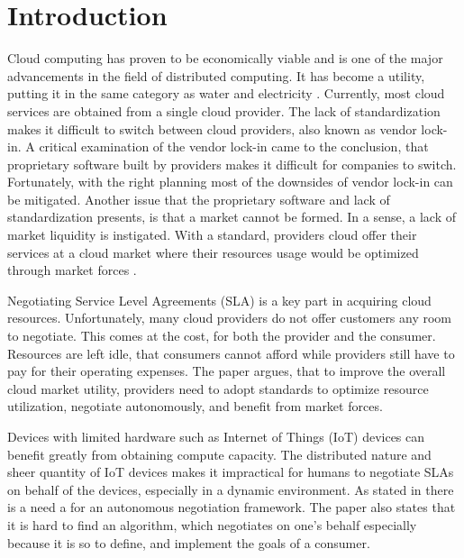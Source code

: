 \chapter{Introduction}



Cloud computing has proven to be economically viable and is one of the major advancements in the field of distributed computing. It has become a utility, putting it in the same category as water and electricity \cite{buyya2009cloud}. Currently, most cloud services are obtained from a single cloud provider. The lack of standardization makes it difficult to switch between cloud providers, also known as vendor lock-in. A critical examination of the vendor lock-in \cite{vendorlockin} came to the conclusion, that proprietary software built by providers makes it difficult for companies to switch. Fortunately, with the right planning most of the downsides of vendor lock-in can be mitigated. Another issue that the proprietary software and lack of standardization presents, is that a market cannot be formed. In a sense, a lack of market liquidity is instigated. With a standard, providers cloud offer their services at a cloud market where their resources usage would be optimized through market forces \cite{autonomous-agent, Dastjerdi2015AnAT}.


Negotiating Service Level Agreements (SLA) is a key part in acquiring cloud resources. Unfortunately, many cloud providers do not offer customers any room to negotiate. This comes at the cost, for both the provider and the consumer. Resources are left idle, that consumers cannot afford while providers still have to pay for their operating expenses. The paper \cite{Dastjerdi2015AnAT} argues, that to improve the overall cloud market utility, providers need to adopt standards to optimize resource utilization, negotiate autonomously, and benefit from market forces.

Devices with limited hardware such as Internet of Things (IoT) devices can benefit greatly from obtaining compute capacity. The distributed nature and sheer quantity of IoT devices makes it impractical for humans to negotiate SLAs on behalf of the devices, especially in a dynamic environment. As stated in \cite{autonomous-agent} there is a need a for an autonomous negotiation framework. The paper also states that it is hard to find an algorithm, which negotiates on one's behalf especially because it is so to define, and implement the goals of a consumer.

